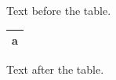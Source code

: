 \documentclass[12pt]{article}
\begin{document}
Text before the table.

\begin{tabular}{||l||}\hline\hline a\\\hline\hline\end{tabular}

Text after the table.
\end{document}
